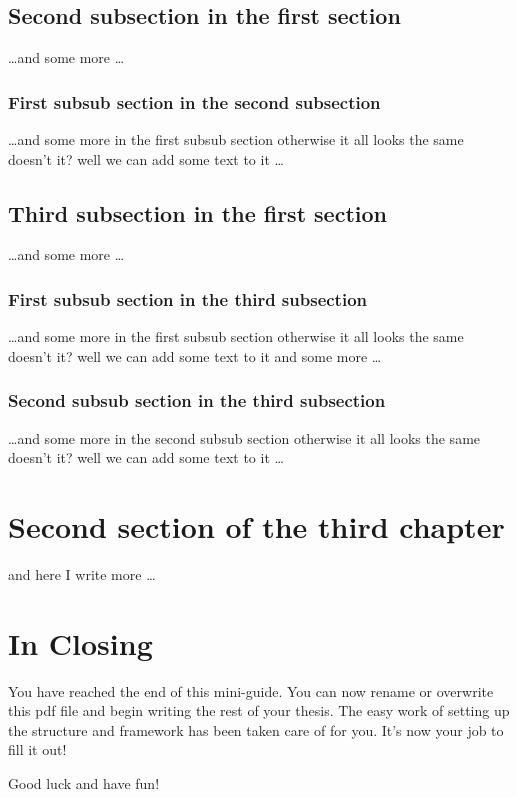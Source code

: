 \subsection{Second subsection in the first section}
\dots and some more \dots

\subsubsection{First subsub section in the second subsection}
\dots and some more in the first subsub section otherwise it all looks the same
doesn't it? well we can add some text to it \dots

\subsection{Third subsection in the first section}
\dots and some more \dots

\subsubsection{First subsub section in the third subsection}
\dots and some more in the first subsub section otherwise it all looks the same
doesn't it? well we can add some text to it and some more \dots

\subsubsection{Second subsub section in the third subsection}
\dots and some more in the second subsub section otherwise it all looks the same
doesn't it? well we can add some text to it \dots

\section{Second section of the third chapter}
and here I write more \dots

\section{In Closing}

You have reached the end of this mini-guide. You can now rename or overwrite this pdf file and begin writing the rest of your thesis. The easy work of setting up the structure and framework has been taken care of for you. It's now your job to fill it out!

Good luck and have fun!

